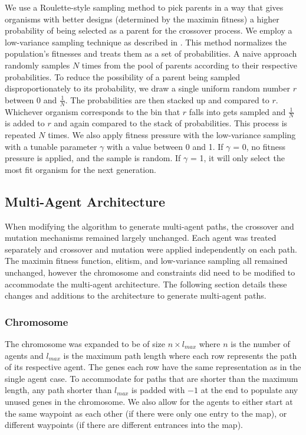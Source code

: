 \documentclass[letterpaper, 10 pt, conference]{ieeeconf}  %
\begin{document}
We use a Roulette-style sampling method to pick parents in a way that gives organisms with better designs (determined by the maximin fitness) a higher probability of being selected as a parent for the crossover process. We employ a low-variance sampling technique as described in \cite{Thrun}. This method normalizes the population's fitnesses and treats them as a set of probabilities. A naive approach randomly samples $N$ times from the pool of parents according to their respective probabilities. To reduce the possibility of a parent being sampled disproportionately to its probability, we draw a single uniform random number $r$ between 0 and $\tfrac{1}{N}$. The probabilities are then stacked up and compared to $r$. Whichever organism corresponds to the bin that $r$ falls into gets sampled and $\tfrac{1}{N}$ is added to $r$ and again compared to the stack of probabilities. This process is repeated $N$ times. We also apply fitness pressure with the low-variance sampling with a tunable parameter $\gamma$ with a value between 0 and 1. If $\gamma$ = 0, no fitness pressure is applied, and the sample is random. If $\gamma$ = 1, it will only select the most fit organism for the next generation.

\subsection{Multi-Agent Architecture}

When modifying the algorithm to generate multi-agent paths, the crossover and mutation mechanisms remained largely unchanged. Each agent was treated separately and crossover and mutation were applied independently on each path. The maximin fitness function, elitism, and low-variance sampling all remained unchanged, however the chromosome and constraints did need to be modified to accommodate the multi-agent architecture. The following section details these changes and additions to the architecture to generate multi-agent paths.

\subsubsection{Chromosome}
The chromosome was expanded to be of size $n \times l_{max}$ where $n$ is the number of agents and $l_{max}$ is the maximum path length where each row represents the path of its respective agent. The genes each row have the same representation as in the single agent case. To accommodate for paths that are shorter than the maximum length, any path shorter than $l_{max}$ is padded with $-1$ at the end to populate any unused genes in the chromosome. We also allow for the agents to either start at the same waypoint as each other (if there were only one entry to the map), or different waypoints (if there are different entrances into the map).
\end{document}
